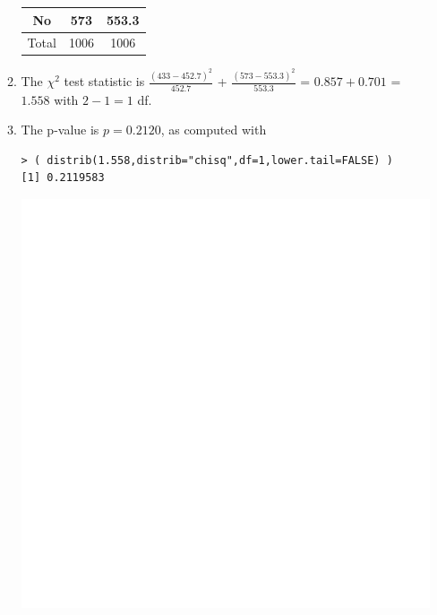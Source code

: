 \documentclass[10pt,openany]{book}\usepackage[]{graphicx}\usepackage[]{color}
\makeatletter
\newenvironment{kframe}{%
 \def\at@end@of@kframe{}%
 \ifinner\ifhmode%
  \def\at@end@of@kframe{\end{minipage}}%
  \begin{minipage}{\columnwidth}%
 \fi\fi%
 \def\FrameCommand##1{\hskip\@totalleftmargin \hskip-\fboxsep
 \colorbox{shadecolor}{##1}\hskip-\fboxsep
     \hskip-\linewidth \hskip-\@totalleftmargin \hskip\columnwidth}%
 \MakeFramed {\advance\hsize-\width
   \@totalleftmargin\z@ \linewidth\hsize
   \@setminipage}}%
 {\par\unskip\endMakeFramed%
 \at@end@of@kframe}
\newenvironment{knitrout}{}{} %
\makeatother
\begin{document}
\begin{itemize}
\begin{enumerate}
\begin{center}
\begin{tabular}{ccc}
            No  & 573 & 553.3 \\
            \hline
            Total & 1006 & 1006 \\
            \hline\hline
          \end{tabular}
        \end{center}
      \item The $\chi^{2}$ test statistic is $\frac{(433-452.7)^{2}}{452.7}$ + $\frac{(573-553.3)^{2}}{553.3}$ = $0.857+0.701$ = $1.558$ with $2-1=1$ df.
      \item The p-value is $p=0.2120$, as computed with
\begin{knitrout}
\color{fgcolor}\begin{kframe}
\begin{verbatim}
> ( distrib(1.558,distrib="chisq",df=1,lower.tail=FALSE) )
[1] 0.2119583
\end{verbatim}
\end{kframe}

{\centering \includegraphics[width=.4\linewidth]{Figs/unnamed-chunk-400-1} 

}




\end{knitrout}
\end{enumerate}
\end{itemize}
\end{document}
